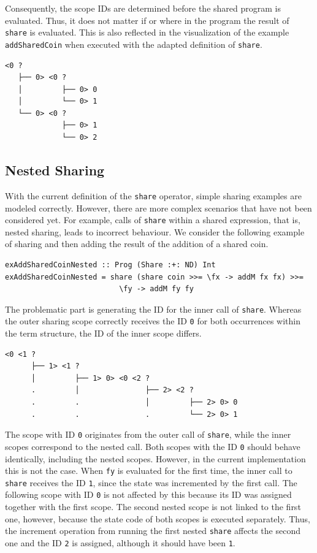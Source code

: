 \documentclass[a4paper, 11pt, fleqn, twoside]{scrreprt}
\newcommand{\hinl}[1]{\texttt{#1}}
\begin{document}
Consequently, the scope IDs are determined before the shared program is evaluated.
Thus, it does not matter if or where in the program the result of \hinl{share} is evaluated.
This is also reflected in the visualization of the example \hinl{addSharedCoin} when executed with the adapted definition of \hinl{share}.

\begin{verbatim}
<0 ? 
   ├── 0> <0 ? 
   │         ├── 0> 0
   │         └── 0> 1
   └── 0> <0 ? 
             ├── 0> 1
             └── 0> 2
\end{verbatim}

\subsection{Nested Sharing}
With the current definition of the \hinl{share} operator, simple sharing examples are modeled correctly.
However, there are more complex scenarios that have not been considered yet.
For example, calls of \hinl{share} within a shared expression, that is, nested sharing, leads to incorrect behaviour.
We consider the following example of sharing and then adding the result of the addition of a shared coin.

\begin{verbatim}
exAddSharedCoinNested :: Prog (Share :+: ND) Int
exAddSharedCoinNested = share (share coin >>= \fx -> addM fx fx) >>= 
                          \fy -> addM fy fy
\end{verbatim}

The problematic part is generating the ID for the inner call of \hinl{share}.
Whereas the outer sharing scope correctly receives the ID \hinl{0} for both occurrences within the term structure, the ID of the inner scope differs.

\begin{verbatim}
<0 <1 ? 
      ├── 1> <1 ? 
      │         ├── 1> 0> <0 <2 ? 
      .         │               ├── 2> <2 ? 
      .         .               │         ├── 2> 0> 0
      .         .               .         └── 2> 0> 1
\end{verbatim}

The scope with ID \hinl{0} originates from the outer call of \hinl{share}, while the inner scopes correspond to the nested call.
Both scopes with the ID \hinl{0} should behave identically, including the nested scopes.
However, in the current implementation this is not the case.
When \hinl{fy} is evaluated for the first time, the inner call to \hinl{share} receives the ID \hinl{1}, since the state was incremented by the first call.
The following scope with ID \hinl{0} is not affected by this because its ID was assigned together with the first scope.
The second nested scope is not linked to the first one, however, because the state code of both scopes is executed separately.
Thus, the increment operation from running the first nested \hinl{share} affects the second one and the ID \hinl{2} is assigned, although it should have been \hinl{1}.
\end{document}
